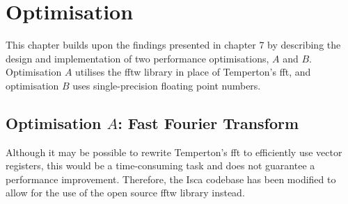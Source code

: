 \documentclass[a4paper,11pt]{report}
\begin{document}
\let\textcircled=\pgftextcircled
\chapter[Optimisation]{Optimisation}
\label{chap:optimiations}
This chapter builds upon the findings presented in chapter 7 by describing the design and implementation of two performance optimisations, $A$ and $B$. Optimisation $A$ utilises the \gls{fftw} library in place of Temperton's \gls{fft}, and optimisation $B$ uses single-precision floating point numbers. 

\section[FFT optimisation]{Optimisation $A$: Fast Fourier Transform}
Although it may be possible to rewrite Temperton's \gls{fft} to efficiently use vector registers, this would be a time-consuming task and does not guarantee a performance improvement. Therefore, the Isca codebase has been modified to allow for the use of the open source \gls{fftw} library instead.
\end{document}
